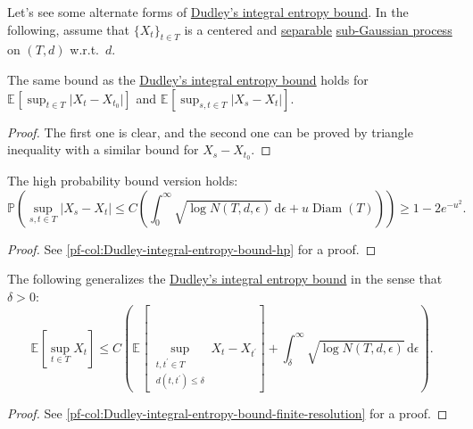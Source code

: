 Let's see some alternate forms of \hyperref[col:Dudley-integral-entropy-bound]{Dudley's integral entropy bound}. In the following, assume that \(\{ X_t \} _{t\in T}\) is a centered and \hyperref[def:separable]{separable} \hyperref[def:sub-Gaussian-process]{sub-Gaussian process} on \((T, d)\) w.r.t.\ \(d\).

\begin{corollary}\label{col:Dudley-integral-entropy-bound-difference}
	The same bound as the \hyperref[col:Dudley-integral-entropy-bound]{Dudley's integral entropy bound} holds for \(\mathbb{E}_{}\left[\sup _{t\in T} \vert X_t - X_{t_0} \vert \right]\) and \(\mathbb{E}_{}\left[\sup _{s, t\in T} \vert X_s - X_t \vert \right]\).
\end{corollary}
\begin{proof}
	The first one is clear, and the second one can be proved by triangle inequality with a similar bound for \(X_s - X_{t_0}\).
\end{proof}

\begin{corollary}\label{col:Dudley-integral-entropy-bound-hp}
	The high probability bound version holds:
	\[
		\mathbb{P} \left(
		\sup _{s, t\in T} \vert X_s - X_t \vert
		\leq C \left( \int_{0}^{\infty} \sqrt{\log N(T, d, \epsilon )}  \,\mathrm{d}\epsilon + u \mathop{\mathrm{Diam}}(T) \right)
		\right) \geq 1 - 2 e^{-u^2}.
	\]
\end{corollary}
\begin{proof}
	See \autoref{pf-col:Dudley-integral-entropy-bound-hp} for a proof.
\end{proof}

\begin{corollary}\label{col:Dudley-integral-entropy-bound-finite-resolution}
	The following generalizes the \hyperref[col:Dudley-integral-entropy-bound]{Dudley's integral entropy bound} in the sense that \(\delta > 0\):
	\[
		\mathbb{E}_{}\left[\sup _{t\in T} X_t \right]
		\leq C  \left( \mathbb{E}_{}\left[ \sup _{\substack{t, t^{\prime} \in T \\ d(t, t^{\prime} ) \leq \delta }} X_t - X_{t^{\prime} } \right] + \int_{\delta }^{\infty} \sqrt{\log N(T, d, \epsilon )} \,\mathrm{d}\epsilon \right) .
	\]
\end{corollary}
\begin{proof}
	See \autoref{pf-col:Dudley-integral-entropy-bound-finite-resolution} for a proof.
\end{proof}

